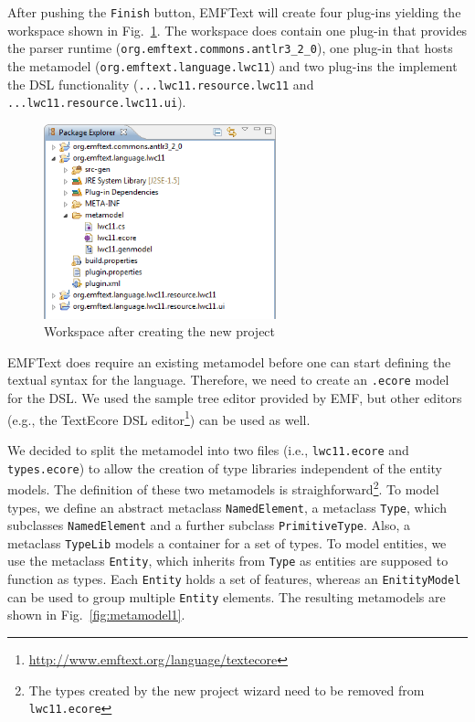 \documentclass[10pt, pdftex]{llncs}
\begin{document}
After pushing the \texttt{Finish} button, EMFText will create four plug-ins
yielding the workspace shown in Fig.~\ref{fig:newproject}. The workspace does
contain one plug-in that provides the parser runtime
(\texttt{org.emftext.commons.antlr3\_2\_0}), one plug-in that hosts the
metamodel (\texttt{org.emftext.language.lwc11}) and two plug-ins the implement
the DSL functionality (\texttt{...lwc11.resource.lwc11} and
\texttt{...lwc11.resource.lwc11.ui}).

\begin{figure}
	\centering
	\includegraphics[width=0.60\textwidth]{figures/newproject.png}
	\caption{Workspace after creating the new project}
	\label{fig:newproject}
\end{figure}

EMFText does require an existing metamodel before one can start defining the
textual syntax for the language. Therefore, we need to create an \texttt{.ecore}
model for the DSL. We used the sample tree editor provided by EMF, but other
editors (e.g., the TextEcore DSL
editor\footnote{\url{http://www.emftext.org/language/textecore}}) can be used
as well.

We decided to split the metamodel into two files (i.e., \texttt{lwc11.ecore} and
\texttt{types.ecore}) to allow the creation of type libraries independent of
the entity models. The definition of these two metamodels is
straighforward\footnote{The types created by the new project wizard need to be
removed from \texttt{lwc11.ecore}}. To model types, we define an abstract
metaclass \texttt{NamedElement}, a metaclass \texttt{Type}, which subclasses 
\texttt{NamedElement} and a further subclass \texttt{PrimitiveType}. Also, a 
metaclass \texttt{TypeLib} models a container
for a set of types. To model entities, we use the metaclass
\texttt{Entity}, which inherits from \texttt{Type} as entities are supposed to
function as types. Each \texttt{Entity} holds a set of features, whereas an
\texttt{EnitityModel} can be used to group multiple \texttt{Entity} elements.
The resulting metamodels are shown in Fig.~\ref{fig:metamodel1}.
\end{document}
